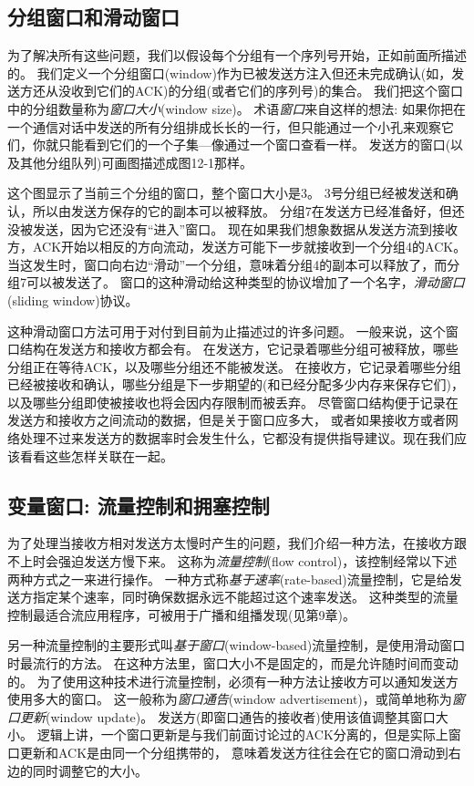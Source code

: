 \documentclass{../main.tex}{subfiles}
\begin{document}
\subsection{分组窗口和滑动窗口}
为了解决所有这些问题，我们以假设每个分组有一个序列号开始，正如前面所描述的。
我们定义一个分组窗口(window)作为已被发送方注入但还未完成确认(如，发送方还从没收到它们的ACK)的分组(或者它们的序列号)的集合。
我们把这个窗口中的分组数量称为\emph{窗口大小}(window size)。
术语\emph{窗口}来自这样的想法:
如果你把在一个通信对话中发送的所有分组排成长长的一行，但只能通过一个小孔来观察它们，你就只能看到它们的一个子集---像通过一个窗口查看一样。
发送方的窗口(以及其他分组队列)可画图描述成图12-1那样。

这个图显示了当前三个分组的窗口，整个窗口大小是3。
3号分组已经被发送和确认，所以由发送方保存的它的副本可以被释放。
分组7在发送方已经准备好，但还没被发送，因为它还没有``进入''窗口。
现在如果我们想象数据从发送方流到接收方，ACK开始以相反的方向流动，发送方可能下一步就接收到一个分组4的ACK。
当这发生时，窗口向右边``滑动''一个分组，意味着分组4的副本可以释放了，而分组7可以被发送了。
窗口的这种滑动给这种类型的协议增加了一个名字，\emph{滑动窗口}(sliding window)协议。

这种滑动窗口方法可用于对付到目前为止描述过的许多问题。
一般来说，这个窗口结构在发送方和接收方都会有。
在发送方，它记录着哪些分组可被释放，哪些分组正在等待ACK，以及哪些分组还不能被发送。
在接收方，它记录着哪些分组已经被接收和确认，哪些分组是下一步期望的(和已经分配多少内存来保存它们)，以及哪些分组即使被接收也将会因内存限制而被丢弃。
尽管窗口结构便于记录在发送方和接收方之间流动的数据，但是关于窗口应多大，
或者如果接收方或者网络处理不过来发送方的数据率时会发生什么，它都没有提供指导建议。现在我们应该看看这些怎样关联在一起。

\subsection{变量窗口: 流量控制和拥塞控制}
为了处理当接收方相对发送方太慢时产生的问题，我们介绍一种方法，在接收方跟不上时会强迫发送方慢下来。
这称为\emph{流量控制}(flow control)，该控制经常以下述两种方式之一来进行操作。
一种方式称\emph{基于速率}(rate-based)流量控制，它是给发送方指定某个速率，同时确保数据永远不能超过这个速率发送。
这种类型的流量控制最适合流应用程序，可被用于广播和组播发现(见第9章)。

另一种流量控制的主要形式叫\emph{基于窗口}(window-based)流量控制，是使用滑动窗口时最流行的方法。
在这种方法里，窗口大小不是固定的，而是允许随时间而变动的。
为了使用这种技术进行流量控制，必须有一种方法让接收方可以通知发送方使用多大的窗口。
这一般称为\emph{窗口通告}(window advertisement)，或简单地称为\emph{窗口更新}(window update)。
发送方(即窗口通告的接收者)使用该值调整其窗口大小。
逻辑上讲，一个窗口更新是与我们前面讨论过的ACK分离的，但是实际上窗口更新和ACK是由同一个分组携带的，
意味着发送方往往会在它的窗口滑动到右边的同时调整它的大小。
\end{document}
